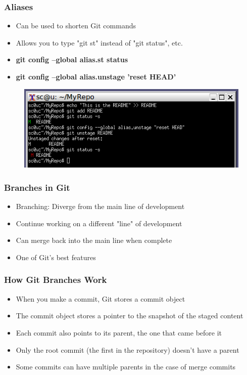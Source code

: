 \documentclass{beamer}
\begin{document}
\begin{frame}
	\frametitle{Aliases}
	\begin{itemize}
		\item{Can be used to shorten Git commands}
		\item{Allows you to type "git st" instead of "git status", etc.}
		\item{\textbf{git config --global alias.st status}}
		\item{\textbf{git config --global alias.unstage 'reset HEAD'}}
	\end{itemize}
	\begin{figure}
		\includegraphics[scale=0.62]{Aliases-0.png}
	\end{figure}
\end{frame}


\begin{frame}
	\frametitle{Branches in Git}
	\begin{itemize}
		\item{Branching: Diverge from the main line of development}
		\item{Continue working on a different "line" of development}
		\item{Can merge back into the main line when complete}
		\item{One of Git's best features}
	\end{itemize}
\end{frame}

\begin{frame}
	\frametitle{How Git Branches Work}
	\begin{itemize}
		\item{When you make a commit, Git stores a commit object}
		\item{The commit object stores a pointer to the snapshot of the staged content}
		\item{Each commit also points to its parent, the one that came before it}
		\item{Only the root commit (the first in the repository) doesn't have a parent}
		\item{Some commits can have multiple parents in the case of merge commits}
	\end{itemize}
\end{frame}
\end{document}
